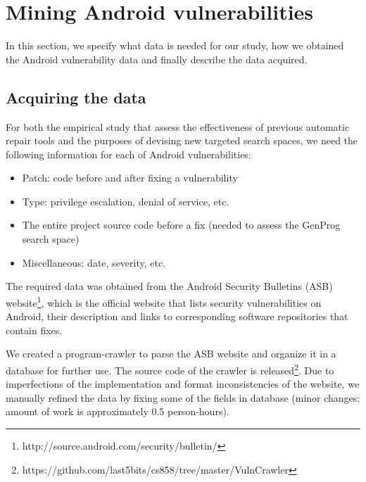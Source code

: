 \section{Mining Android vulnerabilities}

In this section, we specify what data is needed for our study, how we obtained the Android vulnerability data and finally describe the data acquired.

\subsection{Acquiring the data}
\label{section:mining-acquiring}

For both the empirical study that assess the effectiveness of previous automatic repair tools and the purposes of devising new targeted search spaces, we need the following information for each of Android vulnerabilities:
\begin{itemize}
    \item Patch: code before and after fixing a vulnerability
    \item Type: privilege escalation, denial of service, etc.
    \item The entire project source code before a fix (needed to assess the GenProg search space)
    \item Miscellaneous: date, severity, etc.
\end{itemize}


The required data was obtained from the Android Security Bulletins (ASB) website\footnote{http://source.android.com/security/bulletin/}, which is the official website that lists security vulnerabilities on Android, their description and links to corresponding software repositories that contain fixes.

We created a program-crawler to parse the ASB website and organize it in a database for further use. The source code of the crawler is released\footnote{https://github.com/last5bits/cs858/tree/master/VulnCrawler}. Due to imperfections of the implementation and format inconsistencies of the website, we manually refined the data by fixing some of the fields in database (minor changes: amount of work is approximately 0.5 person-hours).

